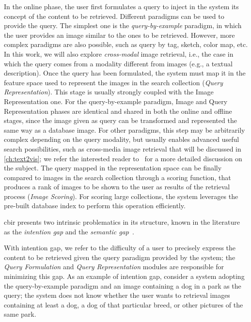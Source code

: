 In the online phase, the user first formulates a query to inject in the system its concept of the content to be retrieved.
Different paradigms can be used to provide the query.
The simplest one is the \emph{query-by-example} paradigm, in which the user provides an image similar to the ones to be retrieved.
However, more complex paradigms are also possible, such as query by tag, sketch, color map, etc.
In this work, we will also explore \emph{cross-modal} image retrieval, i.e.,  the case in which the query comes from a modality different from images (e.g., a textual description).
Once the query has been formulated, the system must map it in the feature space used to represent the images in the search collection (\emph{Query Representation}).
This stage is usually strongly coupled with the Image Representation one.
For the query-by-example paradigm, Image and Query Representation phases are identical and shared in both the online and offline stages, since the image given as query can be transformed and represented the same way as a database image.
For other paradigms, this step may be arbitrarily complex depending on the query modality, but usually enables advanced useful search possibilities, such as cross-media image retrieval that will be discussed in \ref{ch:text2vis};
we refer the interested reader to~\cite{zhou2017recent} for a more detailed discussion on the subject.
The query mapped in the representation space can be finally compared to images in the search collection through a scoring function, that produces a rank of images to be shown to the user as results of the retrieval process (\emph{Image Scoring}).
For scoring large collections, the system leverages the pre-built database index to perform this operation efficiently.

\acrlong{cbir} presents two intrinsic problematics in its structure, known in the literature as the \emph{intention gap} and the \emph{semantic gap}~\cite{datta2008image}.

With intention gap, we refer to the difficulty of a user to precisely express the content to be retrieved given the query paradigm provided by the system;
the \emph{Query Formulation} and \emph{Query Representation} modules are responsible for minimizing this gap.
As an example of intention gap, consider a system adopting the query-by-example paradigm and an image containing a dog in a park as the query;
the system does not know whether the user wants to retrieval images containing at least a dog, a dog of that particular breed, or other pictures of the same park.

